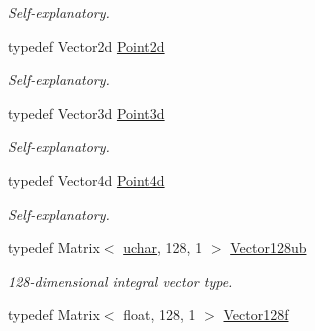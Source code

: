 \begin{DoxyCompactItemize}
\begin{DoxyCompactList}\small\item\em Self-\/explanatory. \end{DoxyCompactList}\item 
\hypertarget{group___eigen_typedefs_ga17451c1ba65dc5ceb1f90e1fc710fa24}{typedef Vector2d \hyperlink{group___eigen_typedefs_ga17451c1ba65dc5ceb1f90e1fc710fa24}{Point2d}}\label{group___eigen_typedefs_ga17451c1ba65dc5ceb1f90e1fc710fa24}

\begin{DoxyCompactList}\small\item\em Self-\/explanatory. \end{DoxyCompactList}\item 
\hypertarget{group___eigen_typedefs_gaa979df133eaeb0d59bc4c11cc09324d1}{typedef Vector3d \hyperlink{group___eigen_typedefs_gaa979df133eaeb0d59bc4c11cc09324d1}{Point3d}}\label{group___eigen_typedefs_gaa979df133eaeb0d59bc4c11cc09324d1}

\begin{DoxyCompactList}\small\item\em Self-\/explanatory. \end{DoxyCompactList}\item 
\hypertarget{group___eigen_typedefs_ga78b225dff8d9416f7c193bff95436d5e}{typedef Vector4d \hyperlink{group___eigen_typedefs_ga78b225dff8d9416f7c193bff95436d5e}{Point4d}}\label{group___eigen_typedefs_ga78b225dff8d9416f7c193bff95436d5e}

\begin{DoxyCompactList}\small\item\em Self-\/explanatory. \end{DoxyCompactList}\item 
\hypertarget{group___eigen_typedefs_ga44bd1dca23704c43b473fed6540c4a81}{typedef Matrix$<$ \hyperlink{group___eigen_typedefs_ga65f85814a8290f9797005d3b28e7e5fc}{uchar}, 128, 1 $>$ \hyperlink{group___eigen_typedefs_ga44bd1dca23704c43b473fed6540c4a81}{Vector128ub}}\label{group___eigen_typedefs_ga44bd1dca23704c43b473fed6540c4a81}

\begin{DoxyCompactList}\small\item\em 128-\/dimensional integral vector type. \end{DoxyCompactList}\item 
\hypertarget{group___eigen_typedefs_ga5af1d2cf882552fe7d1f0f8c673948ad}{typedef Matrix$<$ float, 128, 1 $>$ \hyperlink{group___eigen_typedefs_ga5af1d2cf882552fe7d1f0f8c673948ad}{Vector128f}}\label{group___eigen_typedefs_ga5af1d2cf882552fe7d1f0f8c673948ad}


\end{DoxyCompactItemize}
